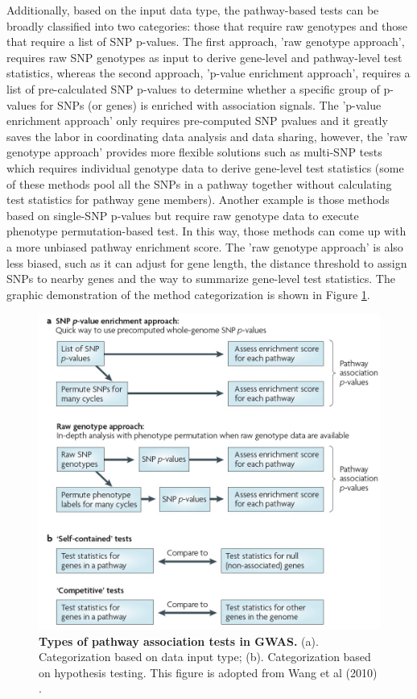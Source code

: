 \documentclass[12pt]{article}
\begin{document}
Additionally, based on the input data type, the pathway-based tests can be broadly classified into two categories: those that require raw genotypes and those that require a list of SNP p-values. The first approach, 'raw genotype approach', requires raw SNP genotypes as input to derive gene-level and pathway-level test statistics, whereas the second approach, 'p-value enrichment approach', requires a list of pre-calculated SNP p-values to determine whether a specific group of p-values for SNPs (or genes) is enriched with association signals. The 'p-value enrichment approach' only requires pre-computed SNP pvalues and it greatly saves the labor in coordinating data analysis and data sharing, however, the 'raw genotype approach' provides more flexible solutions such as multi-SNP tests which requires individual genotype data to derive gene-level test statistics (some of these methods pool all the SNPs in a pathway together without calculating test statistics for pathway gene members). Another example is those methods based on single-SNP p-values but require raw genotype data to execute phenotype permutation-based test. In this way, those methods can come up with a more unbiased pathway enrichment score. The 'raw genotype approach' is also less biased, such as it can adjust for gene length, the distance threshold to assign SNPs to nearby genes and the way to summarize gene-level test statistics. The graphic demonstration of the method categorization is shown in Figure \ref{fig: pathwayTests}.

\begin{figure}[H]
\centering
\includegraphics[scale=0.5]{pathwayTests_definition}

\caption{ \textbf{Types of pathway association tests in GWAS.} (a). Categorization based on data input type; (b). Categorization based on hypothesis testing. This figure is adopted from Wang et al (2010) \cite{Wang2010}. \label{fig: pathwayTests}}
\end{figure}
\end{document}
